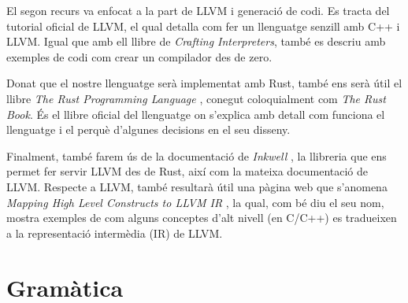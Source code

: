 ﻿\documentclass{article}
\begin{document}
El segon recurs va enfocat a la part de LLVM i generació de codi. Es tracta del
tutorial oficial de LLVM, el qual detalla com fer un llenguatge senzill amb C++
i LLVM. Igual que amb ell llibre de \textit{Crafting Interpreters}, també es
descriu amb exemples de codi com crear un compilador des de zero.

Donat que el nostre llenguatge serà implementat amb Rust, també ens serà útil
el llibre \textit{The Rust Programming Language} \cite{rustbook}, conegut
coloquialment com \textit{The Rust Book}. És el llibre oficial del llenguatge
on s'explica amb detall com funciona el llenguatge i el perquè d'algunes
decisions en el seu disseny.

Finalment, també farem ús de la documentació de \textit{Inkwell} \cite{inkwell},
la llibreria que ens permet fer servir LLVM des de Rust, així com la mateixa
documentació de LLVM. Respecte a LLVM, també resultarà útil una pàgina web
que s'anomena \textit{Mapping High Level Constructs to LLVM IR} \cite{mhlctllvm},
la qual, com bé diu el seu nom, mostra exemples de com alguns conceptes d'alt
nivell (en C/C++) es tradueixen a la representació intermèdia (IR) de LLVM.

\section{Gramàtica}
\end{document}
